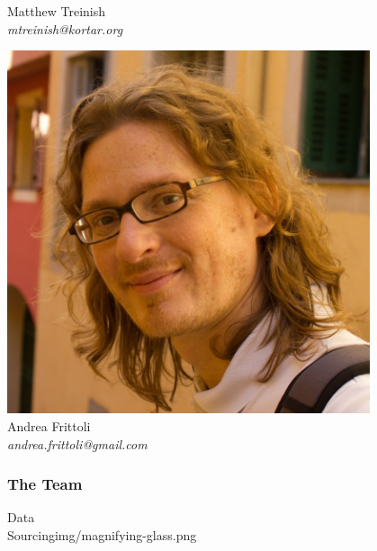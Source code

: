 \documentclass[aspectratio=169,11pt,hyperref={colorlinks=true}]{beamer}
\begin{document}
\begin{3columnsframe}
{\begin{centering}
    Matthew Treinish \\
    \em{mtreinish@kortar.org} \\
  \end{centering}
  }
  {
  \begin{centering}
    \includegraphics[width=0.8\textwidth]{img/af.jpg} \\
    Andrea Frittoli \\
    \em{andrea.frittoli@gmail.com} \\
  \end{centering}
  }
  \frametitle{The Team}
\end{3columnsframe}

\begin{sectionpic}
{Data \\Sourcing}{img/magnifying-glass.png}
\end{sectionpic}
\end{document}
